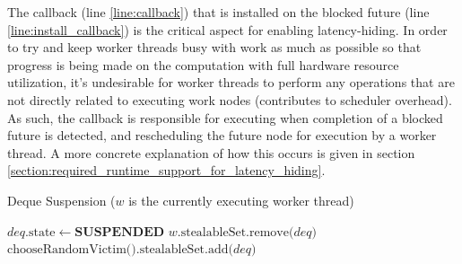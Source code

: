 \documentclass[bsc,frontabs,singlespacing,parskip,deptreport,normalheadings]{infthesis}
\begin{document}
The callback (line \ref{line:callback}) that is installed on the blocked future
(line \ref{line:install_callback}) is the critical aspect for enabling
latency-hiding. In order to try and keep worker threads busy with work as much
as possible so that progress is being made on the computation with full hardware
resource utilization, it's undesirable for worker threads to perform any
operations that are not directly related to executing work nodes (contributes to
scheduler overhead). As such, the callback is responsible for executing when
completion of a blocked future is detected, and rescheduling the future node for
execution by a worker thread. A more concrete explanation of how this occurs is
given in section \ref{section:required_runtime_support_for_latency_hiding}.

\begin{algorithm}
\caption{Deque Suspension ($w$ is the currently executing worker thread)}
\label{alg:suspend_and_find}
\begin{algorithmic}[1]
     \label{line:deque_suspension}
        \State $deq\text{.state} \gets \textbf{SUSPENDED}$
        \State $ w \text{.stealableSet.remove(} deq \text{)}$
            \State $ \text{chooseRandomVictim().stealableSet.add(} deq \text{)}$
        \EndIf
    \EndFunction
\end{algorithmic}
\end{algorithm}
\end{document}
